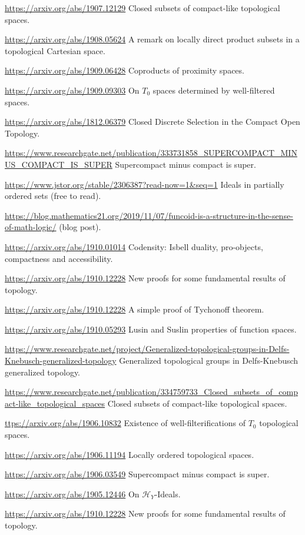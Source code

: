 \documentclass{amsart}
\begin{document}
\url{https://arxiv.org/abs/1907.12129} Closed subsets of compact-like topological spaces.

\url{https://arxiv.org/abs/1908.05624} A remark on locally direct product subsets in a topological Cartesian space.

\url{https://arxiv.org/abs/1909.06428} Coproducts of proximity spaces.

\url{https://arxiv.org/abs/1909.09303} On $T_0$ spaces determined by well-filtered spaces.

\url{https://arxiv.org/abs/1812.06379} Closed Discrete Selection in the Compact Open Topology.

\url{https://www.researchgate.net/publication/333731858_SUPERCOMPACT_MINUS_COMPACT_IS_SUPER}
Supercompact minus compact is super.

\url{https://www.jstor.org/stable/2306387?read-now=1&seq=1} Ideals in partially ordered sets (free to read).

\url{https://blog.mathematics21.org/2019/11/07/funcoid-is-a-structure-in-the-sense-of-math-logic/} (blog post).

\url{https://arxiv.org/abs/1910.01014} Codensity: Isbell duality, pro-objects, compactness and accessibility.

\url{https://arxiv.org/abs/1910.12228} New proofs for some fundamental results of topology.

\url{https://arxiv.org/abs/1910.12228} A simple proof of Tychonoff theorem.

\url{https://arxiv.org/abs/1910.05293} Lusin and Suslin properties of function spaces.

\url{https://www.researchgate.net/project/Generalized-topological-groups-in-Delfs-Knebusch-generalized-topology}
Generalized topological groups in Delfs-Knebusch generalized topology.

\url{https://www.researchgate.net/publication/334759733_Closed_subsets_of_compact-like_topological_spaces}
Closed subsets of compact-like topological spaces.

\url{ttps://arxiv.org/abs/1906.10832} Existence of well-filterifications of $T_0$ topological spaces.

\url{https://arxiv.org/abs/1906.11194} Locally ordered topological spaces.

\url{https://arxiv.org/abs/1906.03549} Supercompact minus compact is super.

\url{https://arxiv.org/abs/1905.12446} On $\mathcal{H}_Y$-Ideals.

\url{https://arxiv.org/abs/1910.12228} New proofs for some fundamental results of topology.
\end{document}
